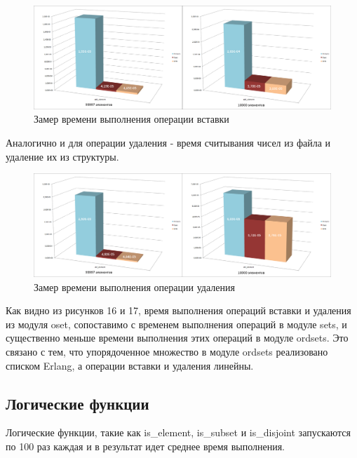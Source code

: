 		\begin{figure}[H]
				\centering
				\includegraphics[width=\textwidth]{img/histograms/add_element.png}
				\caption{Замер времени выполнения операции вставки}
		\end{figure}
		
		Аналогично и для операции удаления - время считывания чисел из файла и удаление их из структуры. 
		
		\begin{figure}[H]
				\centering
				\includegraphics[width=\textwidth]{img/histograms/del_element.png}
				\caption{Замер времени выполнения операции удаления}
		\end{figure}
		
		Как видно из рисунков 16 и 17, время выполнения операций вставки и удаления из модуля oset, сопоставимо 
		с временем выполнения операций в модуле sets, и существенно меньше времени выполнения этих операций
		в модуле ordsets. Это связано с тем, что упорядоченное множество в модуле ordsets реализовано 
		списком Erlang, а операции вставки и удаления линейны. 	
		
	\subsection{Логические функции}
		Логические функции, такие как is\_element, is\_subset и is\_disjoint запускаются по 100 раз
		каждая и в результат идет среднее время выполнения.
		
